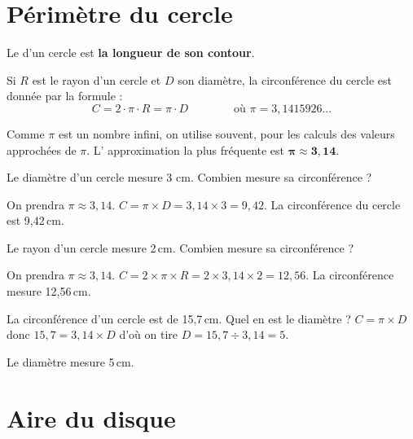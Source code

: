 \section{Périmètre du cercle}



\begin{definition}
Le  d'un cercle est \textbf{la longueur de son contour}.
\end{definition} 


\begin{propriete}
Si $R$ est le rayon d’un cercle et $D$ son diamètre, la circonférence du cercle est donnée par la formule :
\[ C = 2\cdot \pi \cdot R = \pi \cdot D \qquad \qquad \text{où } \pi= 3,1415926... \]
\end{propriete}



\begin{remarque}
Comme $\pi$ est un nombre infini, on utilise souvent, pour les calculs des valeurs approchées de $\pi$. L' approximation la plus fréquente est $\boldsymbol{\pi \approx 3,14}$.
\end{remarque}


\begin{exemple*1}
Le diamètre d'un cercle mesure 3 cm. Combien mesure sa circonférence ?

On prendra $\pi \approx 3,14$.
\correction
$C = \pi  \times D = 3,14 \times 3 = 9,42$. La circonférence du cercle est 9,42\,cm.
\end{exemple*1}


\begin{exemple*1}
Le rayon d'un cercle mesure 2\,cm. Combien mesure sa circonférence ?

On prendra $\pi \approx 3,14$.
\correction
 $C = 2 \times \pi \times R = 2 \times 3,14 \times 2 = 12,56$. La circonférence mesure 12,56\,cm.
\end{exemple*1}




\begin{exemple*1}
La circonférence d'un cercle est de 15,7\,cm. Quel en est le diamètre ?
\correction
$C = \pi \times D$ donc $15,7 = 3,14 \times D$ d'où on tire $D = 15,7 \div 3,14 = 5$.

Le diamètre mesure 5\,cm.
\end{exemple*1}
 	 

		
		
		
\section{Aire du disque}



